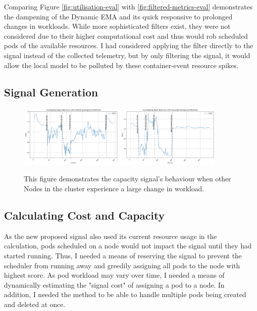Comparing Figure \ref{fig:utilisation-eval} with \ref{fig:filtered-metrics-eval}
demonstrates the dampening of the Dynamic EMA and its quick responsive to
prolonged changes in workloads. While more sophisticated filters exist, they
were not considered due to their higher computational cost and thus would rob
scheduled pods of the available resources. I had considered applying the filter
directly to the signal instead of the collected telemetry, but by only filtering
the signal, it would allow the local model to be polluted by these
container-event resource spikes.

\subsection{Signal Generation}
\begin{figure}[H]
    \centering
    \includegraphics[width=0.45\textwidth]{images/signal-with-cpu.png}
    \includegraphics[width=0.45\textwidth]{images/signal-with-memory.png}
    \caption{This figure demonstrates the capacity signal's behaviour when
    other Nodes in the cluster experience a large change in workload.}
    \label{fig:signal-evaluation}
\end{figure}

\subsection{Calculating Cost and Capacity}
As the new proposed signal also used its current resource usage in the
calculation, pods scheduled on a node would not impact the signal until they had
started running. Thus, I needed a means of reserving the signal to prevent the
scheduler from running away and greedily assigning all pods to the node with
highest score. As pod workload may vary over time, I needed a means of
dynamically estimating the "signal cost" of assigning a pod to a node. In
addition, I needed the method to be able to handle multiple pods being created
and deleted at once.


